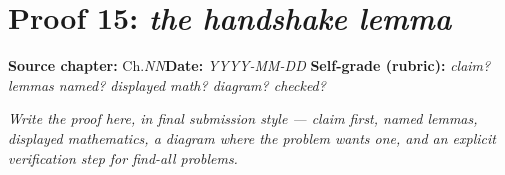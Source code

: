 \documentclass[11pt]{article}
\begin{document}
\section*{Proof 15: \emph{the handshake lemma}}
\textbf{Source chapter:} Ch.\emph{NN}\quad \textbf{Date:} \emph{YYYY-MM-DD}\quad
\textbf{Self-grade (rubric):} \emph{claim? lemmas named? displayed math? diagram? checked?}
\medskip

\emph{Write the proof here, in final submission style — claim first, named lemmas,
displayed mathematics, a diagram where the problem wants one, and an explicit
verification step for find-all problems.}
\end{document}

